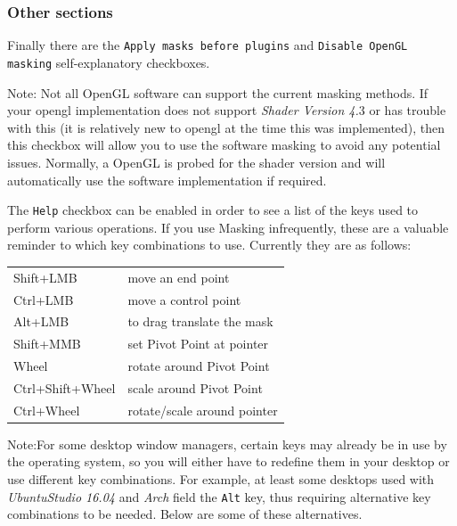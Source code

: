 \subsubsection*{Other sections}%
\label{ssub:other_sections}

Finally there are the \texttt{Apply masks before plugins} and \texttt{Disable OpenGL masking} self-explanatory checkboxes.

Note: Not all OpenGL software can support the current masking methods.  If your opengl implementation does not support \textit{Shader Version 4.}3 or has trouble with this (it is relatively new to opengl at the time this was implemented), then this checkbox will allow you to use the software masking to avoid any potential issues.  Normally, a OpenGL is probed for the shader version and will automatically use the software implementation if required.

The \texttt{Help} checkbox can be enabled in order to see a list of the keys used to perform various operations.  If you use Masking infrequently, these are a valuable reminder to which key combinations to use.  Currently they are as follows:

\vspace{2ex}
\begin{tabular}{ l  l }
    \hline			
    Shift+LMB & move an end point \\
    Ctrl+LMB & move a control point \\
    Alt+LMB & to drag translate the mask \\
    Shift+MMB & set Pivot Point at pointer \\
    Wheel & rotate around Pivot Point \\
    Ctrl+Shift+Wheel & scale around Pivot Point \\
    Ctrl+Wheel & rotate/scale around pointer \\
    \hline  
\end{tabular}

\vspace{2ex} Note:For some desktop window managers, certain keys may already be in use by the operating system, so you will either have to redefine them in your desktop or use different key combinations.  For example, at least some desktops used with \textit{UbuntuStudio 16.04} and \textit{Arch} field the \texttt{Alt} key, thus requiring alternative key combinations to be needed.  Below are some of these alternatives.

